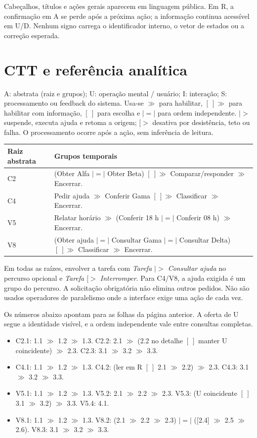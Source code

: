Cabeçalhos, títulos e ações gerais aparecem em linguagem pública. Em R, a confirmação em A se perde após a próxima ação; a informação continua acessível em U/D. Nenhum signo carrega o identificador interno, o vetor de estados ou a correção esperada.

\section{CTT e referência analítica}\label{ap:ctt}
A: abstrata (raiz e grupos); U: operação mental / usuário; I: interação; S: processamento ou feedback do sistema. Usa-se $\gg$ para habilitar, $[\ ]\gg$ para habilitar com informação, $[\ ]$ para escolha e $|=|$ para ordem independente. $|>$ suspende, executa ajuda e retoma a origem; $[>$ desativa por desistência, teto ou falha. O processamento ocorre após a ação, sem inferência de leitura.

\begin{center}\small
\begin{tabularx}{\columnwidth}{@{}lY@{}}\toprule
Raiz abstrata & Grupos temporais\\\midrule
C2 & (Obter Alfa $|=|$ Obter Beta) $[\ ]\gg$ Comparar/responder $\gg$ Encerrar.\\
C4 & Pedir ajuda $\gg$ Conferir Gama $[\ ]\gg$ Classificar $\gg$ Encerrar.\\
V5 & Relatar horário $\gg$ (Conferir 18 h $|=|$ Conferir 08 h) $\gg$ Encerrar.\\
V8 & (Obter ajuda $|=|$ Consultar Gama $|=|$ Consultar Delta) $[\ ]\gg$ Classificar $\gg$ Encerrar.\\\bottomrule
\end{tabularx}
\end{center}

Em todas as raízes, envolver a tarefa com \textit{Tarefa $|>$ Consultar ajuda} no percurso opcional e \textit{Tarefa $[>$ Interromper}. Para C4/V8, a ajuda exigida é um grupo do percurso. A solicitação obrigatória não elimina outros pedidos. Não são usados operadores de paralelismo onde a interface exige uma ação de cada vez.



 Os números abaixo apontam para as folhas da página anterior. A oferta de U segue a identidade visível, e a ordem independente vale entre consultas completas.
\begin{itemize}
\item C2.1: 1.1 $\gg$ 1.2 $\gg$ 1.3. C2.2: 2.1 $\gg$ (2.2 no detalhe $[\ ]$ manter U coincidente) $\gg$ 2.3. C2.3: 3.1 $\gg$ 3.2 $\gg$ 3.3.
\item C4.1: 1.1 $\gg$ 1.2 $\gg$ 1.3. C4.2: (ler em R $[\ ]$ 2.1 $\gg$ 2.2) $\gg$ 2.3. C4.3: 3.1 $\gg$ 3.2 $\gg$ 3.3.
\item V5.1: 1.1 $\gg$ 1.2 $\gg$ 1.3. V5.2: 2.1 $\gg$ 2.2 $\gg$ 2.3. V5.3: (U coincidente $[\ ]$ 3.1 $\gg$ 3.2) $\gg$ 3.3. V5.4: 4.1.
\item V8.1: 1.1 $\gg$ 1.2 $\gg$ 1.3. V8.2: (2.1 $\gg$ 2.2 $\gg$ 2.3) $|=|$ ([2.4] $\gg$ 2.5 $\gg$ 2.6). V8.3: 3.1 $\gg$ 3.2 $\gg$ 3.3.
\end{itemize}

